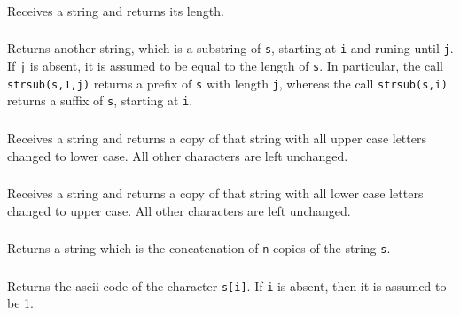 \subsubsection*{}
Receives a string and returns its length.

\subsubsection*{}
Returns another string, which is a substring of \verb's',
starting at \verb'i'  and runing until \verb'j'.
If \verb'j' is absent,
it is assumed to be equal to the length of \verb's'.
In particular, the call \verb'strsub(s,1,j)' returns a prefix of \verb's'
with length \verb'j',
whereas the call \verb'strsub(s,i)' returns a suffix of \verb's',
starting at \verb'i'.

\subsubsection*{}
Receives a string and returns a copy of that string with all
upper case letters changed to lower case.
All other characters are left unchanged.

\subsubsection*{}
Receives a string and returns a copy of that string with all
lower case letters changed to upper case.
All other characters are left unchanged.

\subsubsection*{}
Returns a string which is the concatenation of \verb-n- copies of 
the string \verb-s-.

\subsubsection*{}
Returns the ascii code of the character \verb's[i]'.
If \verb'i' is absent, then it is assumed to be 1.

